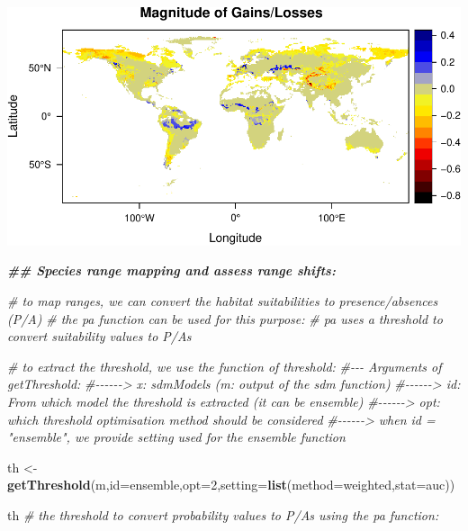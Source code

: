\documentclass[
]{article}
\newenvironment{Shaded}{\begin{snugshade}}{\end{snugshade}}
\newcommand{\AttributeTok}[1]{\textcolor[rgb]{0.13,0.29,0.53}{#1}}
\newcommand{\CommentTok}[1]{\textcolor[rgb]{0.56,0.35,0.01}{\textit{#1}}}
\newcommand{\DecValTok}[1]{\textcolor[rgb]{0.00,0.00,0.81}{#1}}
\newcommand{\DocumentationTok}[1]{\textcolor[rgb]{0.56,0.35,0.01}{\textbf{\textit{#1}}}}
\newcommand{\FunctionTok}[1]{\textcolor[rgb]{0.13,0.29,0.53}{\textbf{#1}}}
\newcommand{\NormalTok}[1]{#1}
\newcommand{\OtherTok}[1]{\textcolor[rgb]{0.56,0.35,0.01}{#1}}
\newcommand{\StringTok}[1]{\textcolor[rgb]{0.31,0.60,0.02}{#1}}
\begin{document}
\includegraphics{sdm_R_files/figure-latex/unnamed-chunk-11-6.pdf}

\begin{Shaded}
\begin{Highlighting}[]
\DocumentationTok{\#\# Species range mapping and assess range shifts:}

\CommentTok{\# to map ranges, we can convert the habitat suitabilities to presence/absences (P/A)}
\CommentTok{\# the \textasciigrave{}pa\textasciigrave{} function can be used for this purpose:}
\CommentTok{\# pa uses a threshold to convert suitability values to P/As}

\CommentTok{\# to extract the threshold, we use the function of \textasciigrave{}threshold\textasciigrave{}:}
\CommentTok{\#{-}{-}{-} Arguments of getThreshold:}
\CommentTok{\#{-}{-}{-}{-}{-}{-}\textgreater{} x: sdmModels (m: output of the sdm function)}
\CommentTok{\#{-}{-}{-}{-}{-}{-}\textgreater{} id: From which model the threshold is extracted (it can be \textquotesingle{}ensemble\textquotesingle{})}
\CommentTok{\#{-}{-}{-}{-}{-}{-}\textgreater{} opt: which threshold optimisation method should be considered}
\CommentTok{\#{-}{-}{-}{-}{-}{-}\textgreater{} when id = "ensemble", we provide setting used for the ensemble function}


\NormalTok{th }\OtherTok{\textless{}{-}} \FunctionTok{getThreshold}\NormalTok{(m,}\AttributeTok{id=}\StringTok{\textquotesingle{}ensemble\textquotesingle{}}\NormalTok{,}\AttributeTok{opt=}\DecValTok{2}\NormalTok{,}\AttributeTok{setting=}\FunctionTok{list}\NormalTok{(}\AttributeTok{method=}\StringTok{\textquotesingle{}weighted\textquotesingle{}}\NormalTok{,}\AttributeTok{stat=}\StringTok{\textquotesingle{}auc\textquotesingle{}}\NormalTok{))}

\NormalTok{th }\CommentTok{\# the threshold to convert probability values to P/As using the \textasciigrave{}pa\textasciigrave{} function:}
\end{Highlighting}
\end{Shaded}
\end{document}
